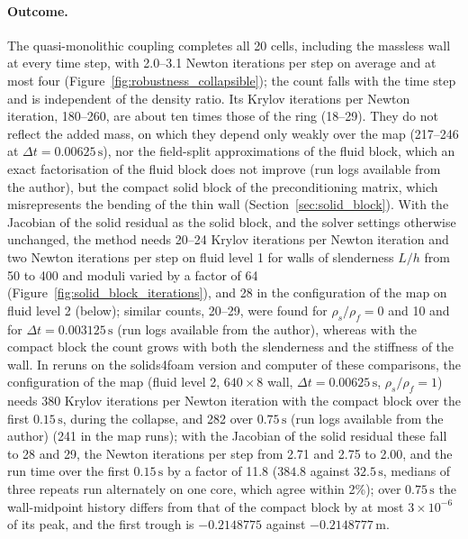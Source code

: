 \paragraph{Outcome.}
The quasi-monolithic coupling completes all 20 cells, including the massless wall at every time step, with 2.0--3.1 Newton iterations per step on average and at most four (Figure~\ref{fig:robustness_collapsible}); the count falls with the time step and is independent of the density ratio.
Its Krylov iterations per Newton iteration, 180--260, are about ten times those of the ring (18--29).
They do not reflect the added mass, on which they depend only weakly over the map (217--246 at $\Delta t = 0.00625\,\mathrm{s}$), nor the field-split approximations of the fluid block, which an exact factorisation of the fluid block does not improve (run logs available from the author), but the compact solid block of the preconditioning matrix, which misrepresents the bending of the thin wall (Section~\ref{sec:solid_block}).
With the Jacobian of the solid residual as the solid block, and the solver settings otherwise unchanged, the method needs 20--24 Krylov iterations per Newton iteration and two Newton iterations per step on fluid level 1 for walls of slenderness $L/h$ from 50 to 400 and moduli varied by a factor of 64 (Figure~\ref{fig:solid_block_iterations}), and 28 in the configuration of the map on fluid level 2 (below); similar counts, 20--29, were found for $\rho_s/\rho_f = 0$ and 10 and for $\Delta t = 0.003125\,\mathrm{s}$ (run logs available from the author), whereas with the compact block the count grows with both the slenderness and the stiffness of the wall.
In reruns on the solids4foam version and computer of these comparisons, the configuration of the map (fluid level 2, $640\times8$ wall, $\Delta t = 0.00625\,\mathrm{s}$, $\rho_s/\rho_f = 1$) needs 380 Krylov iterations per Newton iteration with the compact block over the first $0.15\,\mathrm{s}$, during the collapse, and 282 over $0.75\,\mathrm{s}$ (run logs available from the author) (241 in the map runs); with the Jacobian of the solid residual these fall to 28 and 29, the Newton iterations per step from 2.71 and 2.75 to 2.00, and the run time over the first $0.15\,\mathrm{s}$ by a factor of 11.8 ($384.8$ against $32.5\,\mathrm{s}$, medians of three repeats run alternately on one core, which agree within 2\%); over $0.75\,\mathrm{s}$ the wall-midpoint history differs from that of the compact block by at most $3\times10^{-6}$ of its peak, and the first trough is $-0.2148775$ against $-0.2148777\,\mathrm{m}$.

